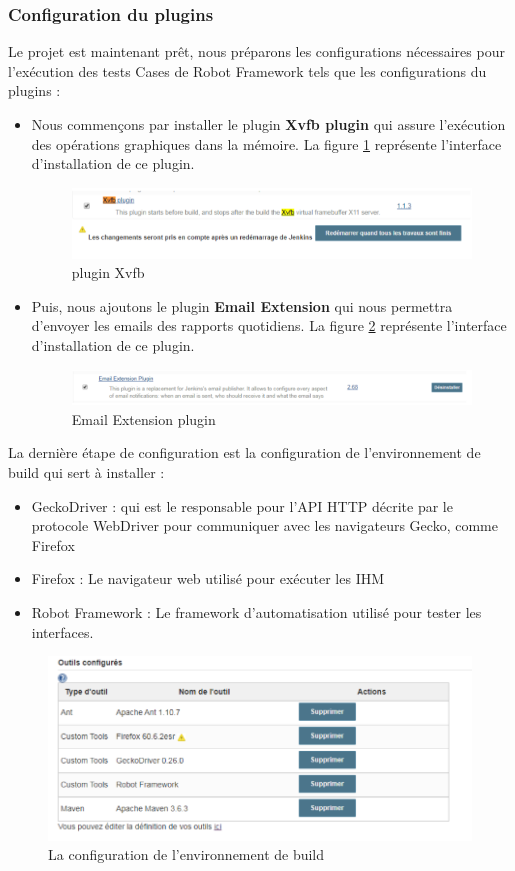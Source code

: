 \subsubsection{Configuration du plugins}
Le projet est maintenant prêt, nous préparons les configurations nécessaires pour l'exécution des tests Cases de Robot Framework tels que les configurations du plugins :
\begin{itemize}
	\item Nous commençons par installer le plugin \textbf{Xvfb plugin} qui assure l'exécution des opérations graphiques dans la mémoire. La figure \ref{fig:xvfb} représente l'interface d'installation de ce plugin.
	\begin{figure}[H]
		\centering
		\includegraphics[width=0.9\linewidth]{img/jenkins/xvfb}
		\caption[plugin Xvfb]{plugin Xvfb}
		\label{fig:xvfb}
	\end{figure}
	
	\item Puis, nous ajoutons le plugin \textbf{Email Extension} qui nous permettra d'envoyer les emails des rapports quotidiens. La figure \ref{fig:email} représente l'interface d'installation de ce plugin.
	\begin{figure}[H]
		\centering
		\includegraphics[width=0.9\linewidth]{img/jenkins/email}
		\caption[Email Extension plugin]{Email Extension plugin}
		\label{fig:email}
	\end{figure}
	
\end{itemize}
La dernière étape de configuration est la configuration de l'environnement de build qui sert à installer :
\begin{itemize}
	\item GeckoDriver : qui est le responsable pour l'API HTTP décrite par le protocole WebDriver pour communiquer avec les navigateurs Gecko, comme Firefox
	\item Firefox : Le navigateur web utilisé pour exécuter les IHM
	\item Robot Framework : Le framework d'automatisation utilisé pour tester les interfaces.
\end{itemize}
\begin{figure}[H]
	\centering
	\includegraphics[width=0.7\linewidth]{img/jenkins/env-build}
	\caption[La configuration de l'environnement de build]{La configuration de l'environnement de build}
	\label{fig:env-build}
\end{figure}
